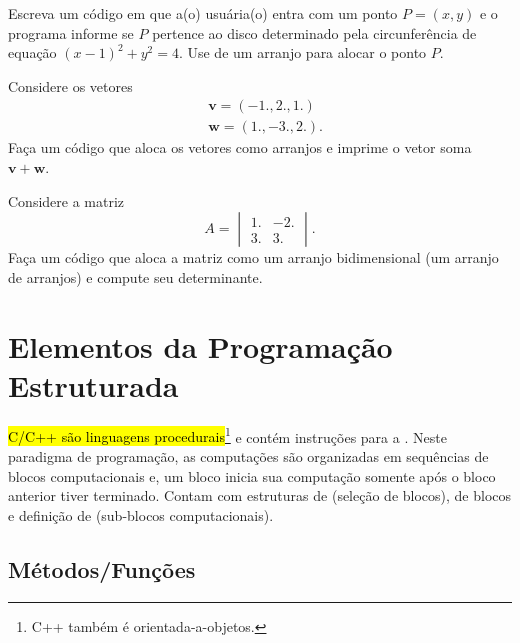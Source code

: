 \documentclass[12pt]{article}
\begin{document}
\begin{exr}
  Escreva um código em que a(o) usuária(o) entra com um ponto $P = (x, y)$ e o programa informe se $P$ pertence ao disco determinado pela circunferência de equação $(x-1)^2 + y^2 = 4$. Use de um arranjo para alocar o ponto $P$.
\end{exr}

\begin{exr}
  Considere os vetores
  \begin{align}
    &\pmb{v} = (-1., 2., 1.)\\
    &\pmb{w} = (1., -3., 2.).
  \end{align}
  Faça um código que aloca os vetores como arranjos e imprime o vetor soma $\pmb{v} + \pmb{w}$.
\end{exr}

\begin{exr}
  Considere a matriz
  \begin{equation}
    A =
    \begin{vmatrix}
      1. & -2.\\
      3. & 3.
    \end{vmatrix}.
  \end{equation}
  Faça um código que aloca a matriz como um arranjo bidimensional (um arranjo de arranjos) e compute seu determinante.
\end{exr}

\section{Elementos da Programação Estruturada}\label{sec_progest}

\hl{C/C++ são linguagens procedurais}\footnote{C++ também é orientada-a-objetos.} e contém instruções para a . Neste paradigma de programação, as computações são organizadas em sequências de blocos computacionais e, um bloco inicia sua computação somente após o bloco anterior tiver terminado. Contam com estruturas de  (seleção de blocos),  de blocos e definição de  (sub-blocos computacionais).

\subsection{Métodos/Funções}
\end{document}
